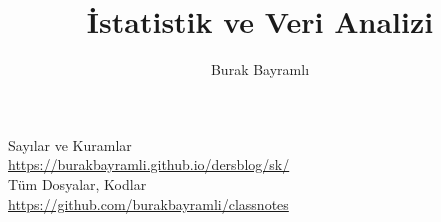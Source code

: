 \documentclass[12pt,a4paper]{report}
\title{İstatistik ve Veri Analizi}
\author{Burak Bayramlı}
\date{}
\begin{document}
\maketitle

\newpage

\vspace*{4cm}
\begin{center}
\vspace{0.5cm}
Sayılar ve Kuramlar\\
\vspace{0.5cm}
\url{https://burakbayramli.github.io/dersblog/sk/}\\
\vspace{0.5cm}
Tüm Dosyalar, Kodlar\\
\vspace{0.5cm}
\url{https://github.com/burakbayramli/classnotes}\\
\end{center}
\end{document}
